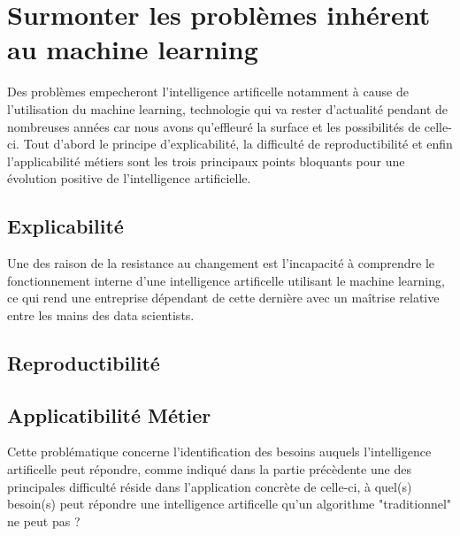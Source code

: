     \chapter{Surmonter les problèmes inhérent au machine learning }
        Des problèmes empecheront l'intelligence artificelle notamment à cause de l'utilisation 
        du machine learning, technologie qui va rester d'actualité pendant de nombreuses années car nous
        avons qu'effleuré la surface et les possibilités de celle-ci.
        Tout d'abord le principe d'explicabilité, la difficulté de reproductibilité et enfin l'applicabilité 
        métiers sont les trois principaux points bloquants pour une évolution positive de 
        l'intelligence artificielle. \newline

        \section{Explicabilité}
            Une des raison de la resistance au changement est l'incapacité à comprendre 
            le fonctionnement interne d'une intelligence artificelle utilisant le machine learning, 
            ce qui rend une entreprise dépendant de cette dernière avec un maîtrise relative
            entre les mains des data scientists. \newline   


        \section{Reproductibilité}


        \section{Applicatibilité Métier}
            Cette problématique concerne l'identification des besoins auquels l'intelligence artificelle 
            peut répondre, comme indiqué dans la partie précèdente une des principales difficulté réside 
            dans l'application concrète de celle-ci, à quel(s) besoin(s) peut répondre une 
            intelligence artificelle qu'un algorithme "traditionnel" ne peut pas ? 





